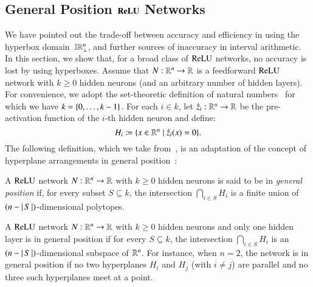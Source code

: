 \documentclass[11pt,times]{article}
\begin{document}
 
\subsection{General Position \texorpdfstring{$\boldsymbol{\ReLU}$}{ReLU} Networks}
\label{subsec:general_position_networks}

We have pointed out the trade-off between accuracy and efficiency in
using the hyperbox domain~$\intvaldom[\R^n\lift]$, and further sources
of inaccuracy in interval arithmetic. In this section, we show that,
for a broad class of $\ReLU$ networks, no accuracy is lost by using
hyperboxes. Assume that $N : \R^n \to \R$ is a feedforward $\ReLU$
network with $k \geq 0$ hidden neurons (and an arbitrary number of
hidden layers). For convenience, we adopt the set-theoretic definition
of natural numbers~\parencite{Jech2002} for which we have
$k = \set{0, \ldots, k-1}$. For each $i \in k$, let
$\hat{z}_i : \R^n \to \R$ be the pre-activation function of the
$i$-th hidden neuron and define:
%
\begin{equation}
  \label{eq:def_H_i}
  H_i \defeq \setbarNormal{x \in \R^n}{\hat{z}_i(x) = 0}.
\end{equation}
%
\noindent
The following
definition, which we take
from~\parencite{Jordan_Dimakis:Exactly_NeurIPS:2020}, is an adaptation of
the concept of hyperplane arrangements in general
position~\parencite{Stanley:Hyperplane_Arrangements:Book:2006}:
%
\begin{definition}
\label{def:ReLU_General_Position}
  A $\ReLU$ network $N : \R^n \to \R$ with $k \geq 0$ hidden neurons
  is said to be in \emph{general position} if, for every subset
  $S \subseteq k$, the intersection $\bigcap_{i \in S} H_i$ is a
  finite union of $(n - \absn{S})$-dimensional polytopes.
\end{definition}

A $\ReLU$ network $N : \R^n \to \R$ with $k \geq 0$ hidden neurons and
only one hidden layer is in general position if for every
$S \subseteq k$, the intersection $\bigcap_{i \in S} H_i$ is an
$(n - \absn{S})$-dimensional subspace of $\R^n$. For instance, when
$n=2$, the network is in general position if no two hyperplanes $H_i$
and $H_j$ (with $i \neq j$) are parallel and no three such hyperplanes
meet at a point.
\end{document}
